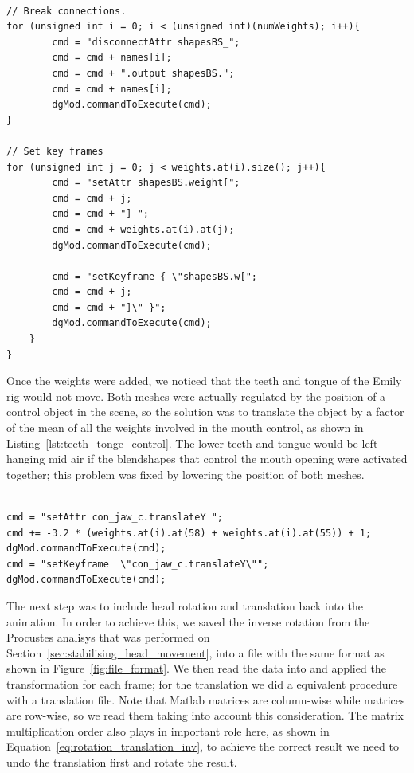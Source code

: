 \begin{lstlisting}[caption = Breaking the weights connections and setting keyframes., label = lst:set_weights, frame=single, float]

// Break connections.
for (unsigned int i = 0; i < (unsigned int)(numWeights); i++){
		cmd = "disconnectAttr shapesBS_";
		cmd = cmd + names[i];
		cmd = cmd + ".output shapesBS.";
		cmd = cmd + names[i];
		dgMod.commandToExecute(cmd);
}

// Set key frames
for (unsigned int j = 0; j < weights.at(i).size(); j++){
		cmd = "setAttr shapesBS.weight[";
		cmd = cmd + j;
		cmd = cmd + "] ";
		cmd = cmd + weights.at(i).at(j);
		dgMod.commandToExecute(cmd);
		
		cmd = "setKeyframe { \"shapesBS.w[";
		cmd = cmd + j;
		cmd = cmd + "]\" }";
		dgMod.commandToExecute(cmd);
	}
}
\end{lstlisting}

Once the weights were added, we noticed that the teeth and tongue of the Emily rig would not move.
Both meshes were actually regulated by the position of a control object in the scene, so the solution was to translate the object by a factor of the mean of all the weights involved in the mouth control, as shown in Listing~\ref{lst:teeth_tonge_control}.
The lower teeth and tongue would be left hanging mid air if the blendshapes that control the mouth opening were activated together; this problem was fixed by lowering the position of both meshes.

\begin{lstlisting}[caption = Teeth and tongue control based on relevant weights., label = lst:teeth_tonge_control, frame=single, float]

cmd = "setAttr con_jaw_c.translateY ";
cmd += -3.2 * (weights.at(i).at(58) + weights.at(i).at(55)) + 1;
dgMod.commandToExecute(cmd);
cmd = "setKeyframe  \"con_jaw_c.translateY\"";
dgMod.commandToExecute(cmd);
\end{lstlisting}

The next step was to include head rotation and translation back into the animation.
In order to achieve this, we saved the inverse rotation from the Procustes analisys that was performed on Section~\ref{sec:stabilising_head_movement}, into a file with the same format as shown in Figure~\ref{fig:file_format}.
We then read the data into \Maya and applied the transformation for each frame; for the translation we did a equivalent procedure with a translation file.
Note that Matlab matrices are column-wise while \Maya matrices are row-wise, so we read them taking into account this consideration.
The matrix multiplication order also plays in important role here, as shown in Equation~\ref{eq:rotation_translation_inv}, to achieve the correct result we need to undo the translation first and rotate the result.

